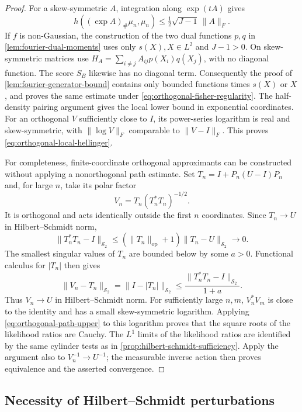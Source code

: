 \begin{proof}
For a skew-symmetric $A$, integration along $\exp(tA)$ gives
\begin{equation}
 h((\exp A)_\#\mu_n,\mu_n)
 \le\tfrac12\sqrt{J-1}\,\|A\|_F.
 \label{eq:orthogonal-path-upper}
\end{equation}
If $f$ is non-Gaussian, the construction of the two dual
functions $p,q$ in \cref{lem:fourier-dual-moments} uses only $s(X),X\in L^2$
and $J-1>0$.  On skew-symmetric matrices use
$H_A=\sum_{i\ne j}A_{ij}p(X_i)q(X_j)$, with no diagonal
function.  The score $S_B$ likewise has no diagonal term.
Consequently the proof of
\cref{lem:fourier-generator-bound} contains only bounded
functions times $s(X)$ or $X$, and proves the same estimate under
\eqref{eq:orthogonal-fisher-regularity}.  The half-density
pairing argument gives the local lower bound in exponential
coordinates.  For an orthogonal $V$ sufficiently close to $I$,
its power-series logarithm is real and skew-symmetric, with
$\|\log V\|_F$ comparable to $\|V-I\|_F$.  This proves
\eqref{eq:orthogonal-local-hellinger}.

For completeness, finite-coordinate orthogonal approximants
can be constructed without applying a nonorthogonal path
estimate.  Set $T_n=I+P_n(U-I)P_n$ and, for large $n$, take its
polar factor
\[
 V_n=T_n(T_n^*T_n)^{-1/2}.
\]
It is orthogonal and acts identically outside the first $n$
coordinates.  Since $T_n\to U$ in Hilbert--Schmidt norm,
\[
 \|T_n^*T_n-I\|_{\mathcal S_2}
 \le(\|T_n\|_{\mathrm{op}}+1)
                         \|T_n-U\|_{\mathcal S_2}\longrightarrow0.
\]
The smallest singular values of $T_n$ are bounded below by
some $a>0$.  Functional calculus for $|T_n|$ then gives
\[
 \|V_n-T_n\|_{\mathcal S_2}
 =\|I-|T_n|\|_{\mathcal S_2}
 \le\frac{\|T_n^*T_n-I\|_{\mathcal S_2}}{1+a}.
\]
Thus $V_n\to U$ in Hilbert--Schmidt norm.  For sufficiently
large $n,m$, $V_n^*V_m$ is close to the identity
and has a small skew-symmetric logarithm.  Applying
\eqref{eq:orthogonal-path-upper} to this logarithm proves
that the square roots of the likelihood ratios are Cauchy.  The $L^1$
limits of the likelihood ratios are identified by the same cylinder tests as in
\cref{prop:hilbert-schmidt-sufficiency}.  Apply the argument also to
$V_n^{-1}\to U^{-1}$; the measurable inverse action then
proves equivalence and the asserted convergence.
\end{proof}

\subsection{Necessity of Hilbert--Schmidt perturbations}
\label{sec:necessity}

